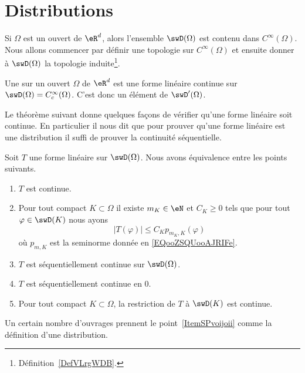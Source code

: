 \section{Distributions}

Si \( \Omega\) est un ouvert de \( \eR^d\), alors l'ensemble \( \swD(\Omega)\) est contenu dans \(  C^{\infty}(\Omega)\). Nous allons commencer par définir une topologie sur \(  C^{\infty}(\Omega)\) et ensuite donner à \( \swD(\Omega)\) la topologie induite\footnote{Définition~\ref{DefVLrgWDB}.}.

\begin{definition}[Distribution]    \label{DefPZDtWVP}
    Une  sur un ouvert \( \Omega\) de \( \eR^d\) est une forme linéaire continue sur \(\swD(\Omega)= C^{\infty}_c(\Omega)\). C'est donc un élément de \( \swD'(\Omega)\).
\end{definition}

Le théorème suivant donne quelques façons de vérifier qu'une forme linéaire soit continue. En particulier il nous dit que pour prouver qu'une forme linéaire est une distribution il suffi de prouver la continuité séquentielle.
\begin{theorem} \label{ThoVDDBnVn}
    Soit \( T\) une forme linéaire sur \( \swD(\Omega)\). Nous avons équivalence entre les points suivants.
    \begin{enumerate}
        \item
            \( T\) est continue.
        \item   \label{ItemSPvoijoii}
            Pour tout compact \( K\subset \Omega\) il existe \( m_K\in \eN\) et \( C_K\geq 0\) tels que pour tout \( \varphi\in\swD(K)\) nous ayons
            \begin{equation}
                \big| T(\varphi) \big|\leq C_K p_{m_K,K}(\varphi)
            \end{equation}
            où \( p_{m,K}\) est la seminorme donnée en \eqref{EQooZSQUooAJRIFe}.
        \item       \label{ITEMooBXFSooYtAXjy}
            \( T\) est séquentiellement continue sur \( \swD(\Omega)\).
        \item
            \( T\) est séquentiellement continue en \( 0\).
        \item
            Pour tout compact \( K\subset \Omega\), la restriction de \( T\) à \( \swD(K)\) est continue.
    \end{enumerate}
\end{theorem}
Un certain nombre d'ouvrages prennent le point~\ref{ItemSPvoijoii} comme la définition d'une distribution.


